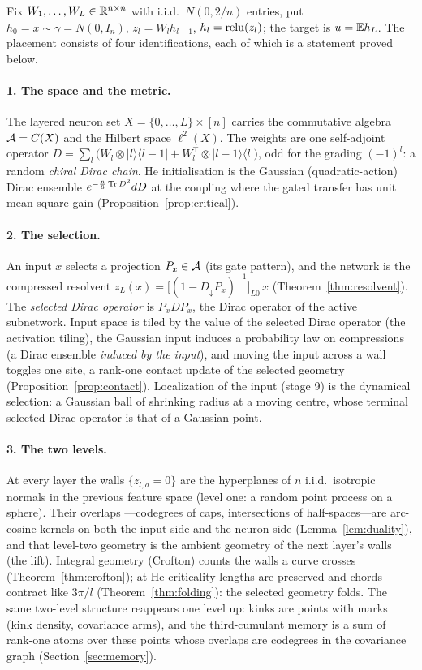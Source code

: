 \label{sec:placement}
Fix $W_1,\dots,W_L\in\mathbb R^{n\times n}$ with i.i.d.\ $N(0,2/n)$ entries, put $h_0=x\sim\gamma=N(0,I_n)$, $z_l=W_lh_{l-1}$,
$h_l=\operatorname{relu}(z_l)$; the target is $u=\mathbb E h_L$. The placement consists of four identifications, each of which is a
statement proved below.

\paragraph{1. The space and the metric.} The layered neuron set $X=\{0,\dots,L\}\times[n]$ carries the commutative
algebra $\mathcal A=C(X)$ and the Hilbert space $\ell^2(X)$. The weights are one self-adjoint operator
$D=\sum_l\big(W_l\otimes|l\rangle\langle l{-}1|+W_l^{\top}\otimes|l{-}1\rangle\langle l|\big)$, odd for the grading
$(-1)^l$: a random \emph{chiral Dirac chain}. He initialisation is the Gaussian (quadratic-action) Dirac ensemble
$e^{-\frac n8\operatorname{Tr} D^2}dD$ at the coupling where the gated transfer has unit mean-square gain (Proposition~\ref{prop:critical}).

\paragraph{2. The selection.} An input $x$ selects a projection $P_x\in\mathcal A$ (its gate pattern), and the network is
the compressed resolvent $z_L(x)=\big[(1-D_{\downarrow}P_x)^{-1}\big]_{L0}\,x$ (Theorem~\ref{thm:resolvent}). The
\emph{selected Dirac operator} is $P_xDP_x$, the Dirac operator of the active subnetwork. Input space is tiled by
the value of the selected Dirac operator (the activation tiling), the Gaussian input induces a probability law on
compressions (a Dirac ensemble \emph{induced by the input}), and moving the input across a wall toggles one site,
a rank-one contact update of the selected geometry (Proposition~\ref{prop:contact}). Localization of the input
(stage 9) is the dynamical selection: a Gaussian ball of shrinking radius at a moving centre, whose terminal
selected Dirac operator is that of a Gaussian point.

\paragraph{3. The two levels.} At every layer the walls $\{z_{l,a}=0\}$ are the hyperplanes of $n$ i.i.d.\
isotropic normals in the previous feature space (level one: a random point process on a sphere). Their overlaps
---codegrees of caps, intersections of half-spaces---are arc-cosine kernels on both the input side and the neuron
side (Lemma~\ref{lem:duality}), and that level-two geometry is the ambient geometry of the next layer's walls (the
lift). Integral geometry (Crofton) counts the walls a curve crosses (Theorem~\ref{thm:crofton}); at He criticality
lengths are preserved and chords contract like $3\pi/l$ (Theorem~\ref{thm:folding}): the selected geometry folds.
The same two-level structure reappears one level up: kinks are points with marks (kink density, covariance arms),
and the third-cumulant memory is a sum of rank-one atoms over these points whose overlaps are codegrees in the
covariance graph (Section~\ref{sec:memory}).

